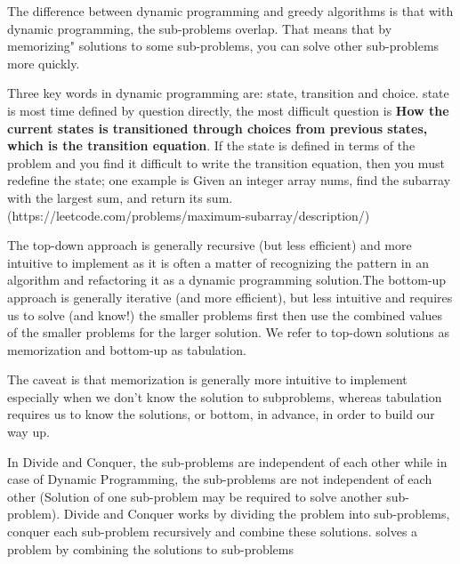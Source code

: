 \documentclass[a4paper,11pt,twoside]{book}
\begin{document}
	\par The difference between dynamic programming and greedy algorithms is that with dynamic programming, the sub-problems overlap. That means that by memorizing" solutions to some sub-problems, you can solve other sub-problems more quickly. 
	
	\par Three key words in dynamic programming are: state, transition and choice. state is most time defined by question directly,  the most difficult question is \textbf{How the current states is transitioned through choices from previous states, which is the transition equation}. If the state is defined in terms of the problem and you find it difficult to write the transition equation, then you must redefine the state; one example is Given an integer array nums, find the 
	subarray with the largest sum, and return its sum. (https://leetcode.com/problems/maximum-subarray/description/)
	
	
	\par The top-down approach is generally recursive (but less efficient) and more intuitive to implement as it is often a matter of recognizing the pattern in an algorithm and refactoring it as a dynamic programming solution.The bottom-up approach is generally iterative (and more efficient), but less intuitive and requires us to solve (and know!) the smaller problems first then use the combined values of the smaller problems for the larger solution. We refer to top-down solutions as memorization and bottom-up as tabulation.
	
	
%	
	
	\par The caveat is that memorization is generally more intuitive to implement especially when we don’t know the solution to subproblems, whereas tabulation requires us to know the solutions, or bottom, in advance, in order to build our way up.
	
	\par In Divide and Conquer, the sub-problems are independent of each other while in case of Dynamic Programming, the sub-problems are not independent of each other (Solution of one sub-problem may be required to solve another sub-problem). Divide and Conquer works by dividing the problem into sub-problems, conquer each sub-problem recursively and combine these solutions. solves a problem by combining the solutions to sub-problems
	
\end{document}
